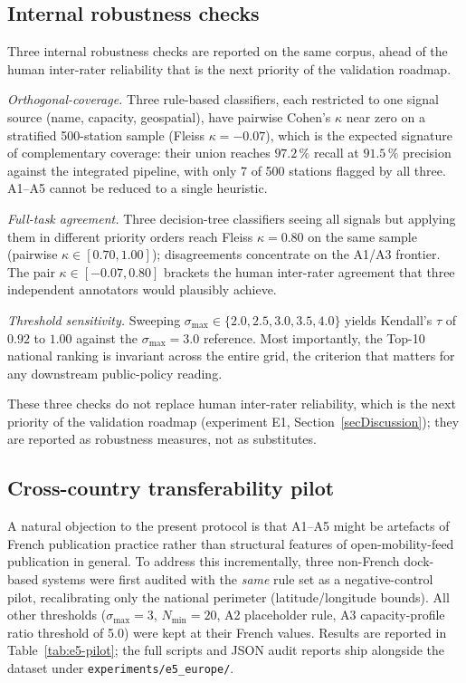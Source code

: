 \documentclass[11pt,a4paper]{article}
\begin{document}
\subsection{Internal robustness checks}\label{secInternal}
Three internal robustness checks are reported on the same corpus,
ahead of the human inter-rater reliability that is the next
priority of the validation roadmap.

\emph{Orthogonal-coverage.}
Three rule-based classifiers, each restricted to one signal source
(name, capacity, geospatial), have pairwise Cohen's $\kappa$ near
zero on a stratified 500-station sample (Fleiss $\kappa = -0.07$),
which is the expected signature of complementary coverage: their
union reaches $97.2\,\%$ recall at $91.5\,\%$ precision against the
integrated pipeline, with only 7 of 500 stations flagged by all
three. A1--A5 cannot be reduced to a single heuristic.

\emph{Full-task agreement.}
Three decision-tree classifiers seeing all signals but applying them
in different priority orders reach Fleiss $\kappa = 0.80$ on the
same sample (pairwise $\kappa \in [0.70, 1.00]$); disagreements
concentrate on the A1/A3 frontier. The pair
$\kappa \in [-0.07, 0.80]$ brackets the human inter-rater agreement
that three independent annotators would plausibly achieve.

\emph{Threshold sensitivity.}
Sweeping $\sigma_{\max} \in \{2.0, 2.5, 3.0, 3.5, 4.0\}$ yields
Kendall's $\tau$ of $0.92$ to $1.00$ against the
$\sigma_{\max} = 3.0$ reference. Most importantly, the Top-10
national ranking is invariant across the entire grid, the criterion
that matters for any downstream public-policy reading.

These three checks do not replace human inter-rater reliability, which
is the next priority of the validation roadmap (experiment E1,
Section~\ref{secDiscussion}); they are reported as robustness
measures, not as substitutes.

\subsection{Cross-country transferability pilot}\label{secCrossCountry}
A natural objection to the present protocol is that A1--A5 might be
artefacts of French publication practice rather than structural
features of open-mobility-feed publication in general. To address this
incrementally, three non-French dock-based systems were first audited
with the \emph{same} rule set as a negative-control pilot, recalibrating
only the national perimeter
(latitude/longitude bounds). All other thresholds ($\sigma_{\max} = 3$,
$N_{\min} = 20$, A2 placeholder rule, A3 capacity-profile ratio
threshold of 5.0) were kept at their French values. Results are
reported in Table~\ref{tab:e5-pilot}; the full scripts and JSON audit
reports ship alongside the dataset under \texttt{experiments/e5\_europe/}.
\end{document}
